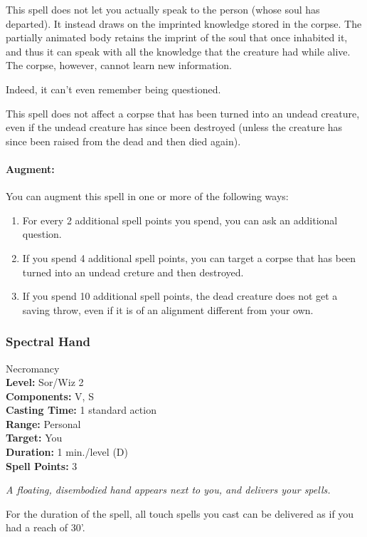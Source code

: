 This spell does not let you actually speak to the person (whose soul has departed). 
It instead draws on the imprinted knowledge stored in the corpse. 
The partially animated body retains the imprint of the soul that once inhabited it, and thus it can speak with all the knowledge that the creature had while alive. 
The corpse, however, cannot learn new information.

Indeed, it can't even remember being questioned.

This spell does not affect a corpse that has been turned into an undead creature, even if the undead creature has since been destroyed (unless the creature has since been raised from the dead and then died again).

\paragraph{Augment:} You can augment this spell in one or more of the following ways:
\begin{enumerate}
 \item For every 2 additional spell points you spend, you can ask an additional question.
 \item If you spend 4 additional spell points, you can target a corpse that has been turned into an undead creture and then destroyed.
 \item If you spend 10 additional spell points, the dead creature does not get a saving throw, even if it is of an alignment different from your own.
\end{enumerate}

\subsubsection{Spectral Hand}
\label{Spell:SpectralHand}
Necromancy
\\ \textbf{Level:} Sor/Wiz 2
\\ \textbf{Components:} V, S
\\ \textbf{Casting Time:} 1 standard action
\\ \textbf{Range:} Personal
\\ \textbf{Target:} You
\\ \textbf{Duration:} 1 min./level (D)
\\ \textbf{Spell Points:} 3

\emph{A floating, disembodied hand appears next to you, and delivers your spells.}

For the duration of the spell, all touch spells you cast can be delivered as if you had a reach of 30'.

